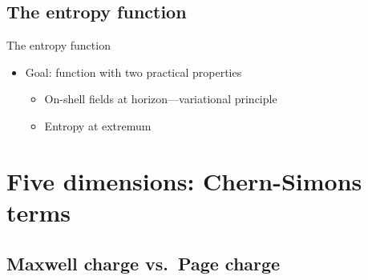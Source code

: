 \documentclass{beamer}
\begin{document}
\subsection{The entropy function}

\begin{frame}{The entropy function}

  \begin{itemize}
  
  \item Goal: function with two practical properties
    \begin{itemize}
    \item On-shell fields at horizon---variational principle
    \item Entropy at extremum
    \end{itemize}
  
  \end{itemize}

\end{frame}


\section{Five dimensions: Chern-Simons terms}

\subsection{Maxwell charge vs.\ Page charge}
\end{document}
